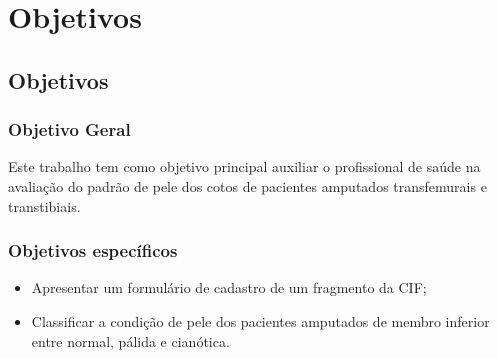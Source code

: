 \part{Objetivos}
\chapter[Objetivos]{Objetivos}

\section{Objetivo Geral}
    Este trabalho tem como objetivo principal auxiliar o profissional de saúde na avaliação do padrão de pele dos cotos de pacientes amputados transfemurais e transtibiais.

\section{Objetivos específicos}
    \begin{itemize}
        \item Apresentar um formulário de cadastro de um fragmento da CIF;
        \item Classificar a condição de pele dos pacientes amputados de membro inferior entre normal, pálida e cianótica.
    \end{itemize}
